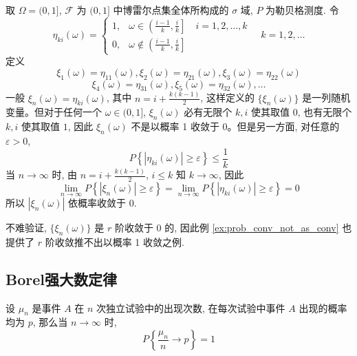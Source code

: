\begin{example} \label{ex:prob_conv_not_as_conv}
取 $\Omega=(0,1]$, $\mathcal{F}$ 为 $(0,1]$ 中博雷尔点集全体所构成的 $\sigma$ 域, $P$ 为勒贝格测度. 令
\begin{equation} \label{eq:eta_ki_def}
\eta_{ki}(\omega) = \begin{cases}
1, & \omega \in \left(\frac{i-1}{k}, \frac{i}{k}\right] \quad i=1,2,\ldots,k \\
0, & \omega \notin \left(\frac{i-1}{k}, \frac{i}{k}\right]
\end{cases} \quad k=1,2,\ldots
\end{equation}
定义
\[
\xi_1(\omega) = \eta_{11}(\omega), \xi_2(\omega) = \eta_{21}(\omega), \xi_3(\omega) = \eta_{22}(\omega)
\]
\[
\xi_4(\omega) = \eta_{31}(\omega), \xi_5(\omega) = \eta_{32}(\omega), \ldots
\]
一般 $\xi_n(\omega) = \eta_{ki}(\omega)$, 其中 $n=i+\frac{k(k-1)}{2}$, 这样定义的 $\{\xi_n(\omega)\}$ 是一列随机变量。但对于任何一个 $\omega \in (0,1]$, $\xi_n(\omega)$ 必有无限个 $k,i$ 使其取值 $0$, 也有无限个 $k,i$ 使其取值 $1$, 因此 $\xi_n(\omega)$ 不是以概率 1 收敛于 $0$。但是另一方面, 对任意的 $\varepsilon>0$,
\[
P\left\{ |\eta_{ki}(\omega)|\ge\varepsilon \right\} \le \frac{1}{k}
\]
当 $n\to\infty$ 时, 由 $n=i+\frac{k(k-1)}{2}$, $i \le k$ 知 $k\to\infty$, 因此
\[
\lim_{n\to\infty} P\left\{ |\xi_n(\omega)|\ge\varepsilon \right\} = \lim_{n\to\infty} P\left\{ |\eta_{ki}(\omega)|\ge\varepsilon \right\} = 0
\]
所以 $|\xi_n(\omega)|$ 依概率收敛于 $0$.
\end{example}
\begin{remark}
    不难验证, $\{\xi_n(\omega)\}$ 是 $r$ 阶收敛于 $0$ 的, 因此例 \ref{ex:prob_conv_not_as_conv} 也提供了 $r$ 阶收敛推不出以概率 1 收敛之例.
\end{remark}
\subsection{Borel强大数定律}\label{subsec:Borel强大数定律}
\begin{theorem} \label{thm:borel_lln}
设 $\mu_n$ 是事件 $A$ 在 $n$ 次独立试验中的出现次数, 在每次试验中事件 $A$ 出现的概率均为 $p$, 那么当 $n\to\infty$ 时,
\begin{equation} \label{eq:borel_lln_formula}
P\left\{ \frac{\mu_n}{n}\to p \right\}=1
\end{equation}
\end{theorem}

